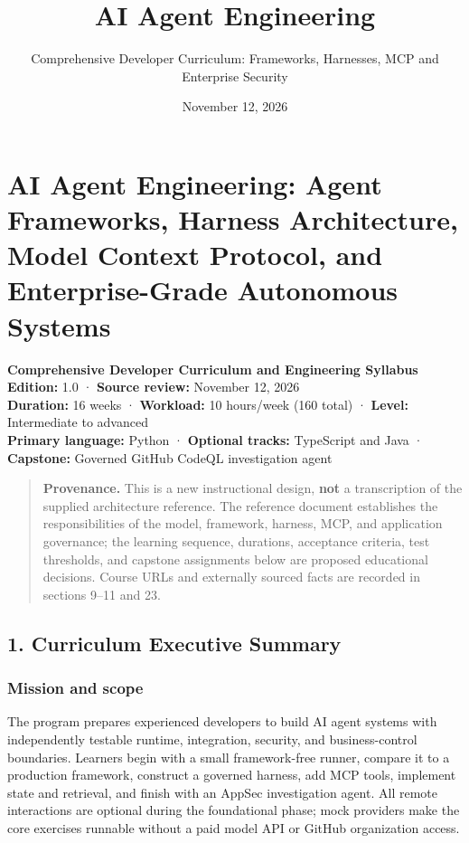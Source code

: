 \documentclass[
  10pt,
]{article}
\title{AI Agent Engineering}
\subtitle{Comprehensive Developer Curriculum: Frameworks, Harnesses, MCP
and Enterprise Security}
\author{}
\date{November 12, 2026}
\begin{document}
\maketitle

{
\setcounter{tocdepth}{2}
\tableofcontents
}
\section{AI Agent Engineering: Agent Frameworks, Harness Architecture,
Model Context Protocol, and Enterprise-Grade Autonomous
Systems}\label{ai-agent-engineering-agent-frameworks-harness-architecture-model-context-protocol-and-enterprise-grade-autonomous-systems}

\textbf{Comprehensive Developer Curriculum and Engineering Syllabus}\\
\textbf{Edition:} 1.0 · \textbf{Source review:} November 12, 2026\\
\textbf{Duration:} 16 weeks · \textbf{Workload:} 10 hours/week (160
total) · \textbf{Level:} Intermediate to advanced\\
\textbf{Primary language:} Python · \textbf{Optional tracks:} TypeScript
and Java · \textbf{Capstone:} Governed GitHub CodeQL investigation agent

\begin{quote}
\textbf{Provenance.} This is a new instructional design, \textbf{not} a
transcription of the supplied architecture reference. The reference
document establishes the responsibilities of the model, framework,
harness, MCP, and application governance; the learning sequence,
durations, acceptance criteria, test thresholds, and capstone
assignments below are proposed educational decisions. Course URLs and
externally sourced facts are recorded in sections 9--11 and 23.
\end{quote}

\newpage
\subsection{1. Curriculum Executive
Summary}\label{curriculum-executive-summary}

\subsubsection{Mission and scope}\label{mission-and-scope}

The program prepares experienced developers to build AI agent systems
with independently testable runtime, integration, security, and
business-control boundaries. Learners begin with a small framework-free
runner, compare it to a production framework, construct a governed
harness, add MCP tools, implement state and retrieval, and finish with
an AppSec investigation agent. All remote interactions are optional
during the foundational phase; mock providers make the core exercises
runnable without a paid model API or GitHub organization access.
\end{document}
